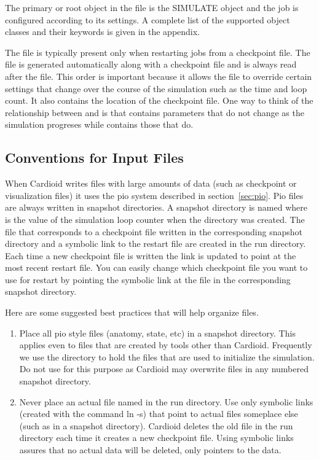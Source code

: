 \documentclass{article}
\begin{document}
The primary or root object in the  file is the
SIMULATE object and the job is configured according to its settings.  A
complete list of the supported object classes and their keywords is
given in the appendix.

The  file is typically present only when restarting jobs
from a checkpoint file.  The  file is generated
automatically along with a checkpoint file and is always read after the
 file.  This order is important because it allows the
 file to override certain settings that change over the
course of the simulation such as the time and loop count.  It also
contains the location of the checkpoint file.  One way to think of the
relationship between  and  is that
 contains parameters that do not change as the
simulation progreses while  contains those that do.

\subsection{Conventions for Input Files}

When Cardioid writes files with large amounts of data (such as
checkpoint or visualization files) it uses the pio system described in
section~\ref{sec:pio}.  Pio files are always written in snapshot
directories.  A snapshot directory is named 
where  is the value of the simulation loop counter when
the directory was created.  The  file that corresponds to
a checkpoint file written in the corresponding snapshot directory and a
symbolic link to the restart file are created in the run directory.  Each
time a new checkpoint file is written the link is updated to point at
the most recent restart file.  You can easily change which checkpoint
file you want to use for restart by pointing the symbolic link at the 
 file in the corresponding snapshot directory.

Here are some suggested best practices that will help organize files.
\begin{enumerate}
\item  Place all pio style files (anatomy, state, etc) in a snapshot
  directory.  This applies even to files that are created by tools other
  than Cardioid.  Frequently we use the directory
   to hold the files that are used to initialize
  the simulation.  Do not use  for this purpose
  as Cardioid may overwrite files in any numbered snapshot directory.
\item Never place an actual file named  in the run
  directory.  Use only symbolic links (created with the command ln -s)
  that point to actual files someplace else (such as in a snapshot
  directory).  Cardioid deletes the old  file in the run
  directory each time it creates a new checkpoint file.  Using symbolic
  links assures that no actual data will be deleted, only pointers to
  the data.
\end{enumerate}
\end{document}
